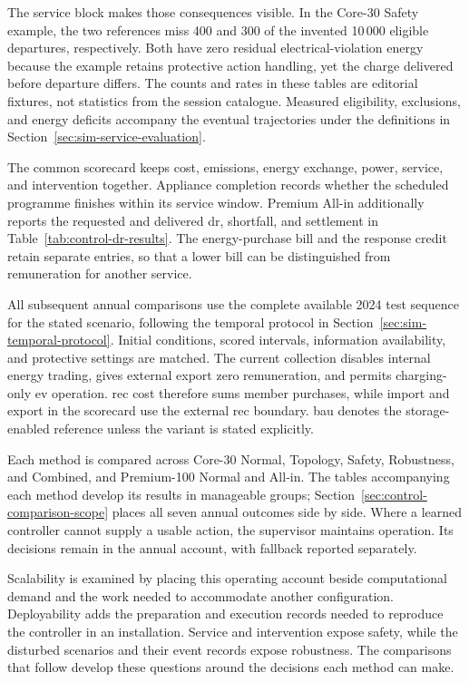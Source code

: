 

\illustrativereading The service block makes those consequences visible. In the Core-30 Safety example, the two references miss 400 and 300 of the invented 10\,000 eligible departures, respectively. Both have zero residual electrical-violation energy because the example retains protective action handling, yet the charge delivered before departure differs. The counts and rates in these tables are editorial fixtures, not statistics from the session catalogue. Measured eligibility, exclusions, and energy deficits accompany the eventual trajectories under the definitions in Section~\ref{sec:sim-service-evaluation}.

The common scorecard keeps cost, emissions, energy exchange, power, service, and intervention together. Appliance completion records whether the scheduled programme finishes within its service window. Premium All-in additionally reports the requested and delivered \gls{dr}, shortfall, and settlement in Table~\ref{tab:control-dr-results}. The energy-purchase bill and the response credit retain separate entries, so that a lower bill can be distinguished from remuneration for another service.

All subsequent annual comparisons use the complete available 2024 test sequence for the stated scenario, following the temporal protocol in Section~\ref{sec:sim-temporal-protocol}. Initial conditions, scored intervals, information availability, and protective settings are matched. The current collection disables internal energy trading, gives external export zero remuneration, and permits charging-only \gls{ev} operation. \gls{rec} cost therefore sums member purchases, while import and export in the scorecard use the external \gls{rec} boundary. \gls{bau} denotes the storage-enabled reference unless the variant is stated explicitly.

Each method is compared across Core-30 Normal, Topology, Safety, Robustness, and Combined, and Premium-100 Normal and All-in. The tables accompanying each method develop its results in manageable groups; Section~\ref{sec:control-comparison-scope} places all seven annual outcomes side by side. Where a learned controller cannot supply a usable action, the supervisor maintains operation. Its decisions remain in the annual account, with fallback reported separately.

Scalability is examined by placing this operating account beside computational demand and the work needed to accommodate another configuration. Deployability adds the preparation and execution records needed to reproduce the controller in an installation. Service and intervention expose safety, while the disturbed scenarios and their event records expose robustness. The comparisons that follow develop these questions around the decisions each method can make.


